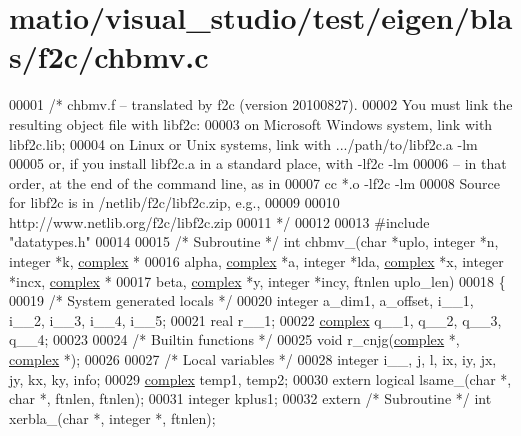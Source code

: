 \hypertarget{matio_2visual__studio_2test_2eigen_2blas_2f2c_2chbmv_8c_source}{}\section{matio/visual\+\_\+studio/test/eigen/blas/f2c/chbmv.c}
\label{matio_2visual__studio_2test_2eigen_2blas_2f2c_2chbmv_8c_source}

\begin{DoxyCode}
00001 \textcolor{comment}{/* chbmv.f -- translated by f2c (version 20100827).}
00002 \textcolor{comment}{   You must link the resulting object file with libf2c:}
00003 \textcolor{comment}{    on Microsoft Windows system, link with libf2c.lib;}
00004 \textcolor{comment}{    on Linux or Unix systems, link with .../path/to/libf2c.a -lm}
00005 \textcolor{comment}{    or, if you install libf2c.a in a standard place, with -lf2c -lm}
00006 \textcolor{comment}{    -- in that order, at the end of the command line, as in}
00007 \textcolor{comment}{        cc *.o -lf2c -lm}
00008 \textcolor{comment}{    Source for libf2c is in /netlib/f2c/libf2c.zip, e.g.,}
00009 \textcolor{comment}{}
00010 \textcolor{comment}{        http://www.netlib.org/f2c/libf2c.zip}
00011 \textcolor{comment}{*/}
00012 
00013 \textcolor{preprocessor}{#include "datatypes.h"}
00014 
00015 \textcolor{comment}{/* Subroutine */} \textcolor{keywordtype}{int} chbmv\_(\textcolor{keywordtype}{char} *uplo, integer *n, integer *k, \hyperlink{structcomplex}{complex} *
00016     alpha, \hyperlink{structcomplex}{complex} *a, integer *lda, \hyperlink{structcomplex}{complex} *x, integer *incx, 
      \hyperlink{structcomplex}{complex} *
00017     beta, \hyperlink{structcomplex}{complex} *y, integer *incy, ftnlen uplo\_len)
00018 \{
00019     \textcolor{comment}{/* System generated locals */}
00020     integer a\_dim1, a\_offset, i\_\_1, i\_\_2, i\_\_3, i\_\_4, i\_\_5;
00021     real r\_\_1;
00022     \hyperlink{structcomplex}{complex} q\_\_1, q\_\_2, q\_\_3, q\_\_4;
00023 
00024     \textcolor{comment}{/* Builtin functions */}
00025     \textcolor{keywordtype}{void} r\_cnjg(\hyperlink{structcomplex}{complex} *, \hyperlink{structcomplex}{complex} *);
00026 
00027     \textcolor{comment}{/* Local variables */}
00028     integer i\_\_, j, l, ix, iy, jx, jy, kx, ky, info;
00029     \hyperlink{structcomplex}{complex} temp1, temp2;
00030     \textcolor{keyword}{extern} logical lsame\_(\textcolor{keywordtype}{char} *, \textcolor{keywordtype}{char} *, ftnlen, ftnlen);
00031     integer kplus1;
00032     \textcolor{keyword}{extern} \textcolor{comment}{/* Subroutine */} \textcolor{keywordtype}{int} xerbla\_(\textcolor{keywordtype}{char} *, integer *, ftnlen);

\end{DoxyCode}
